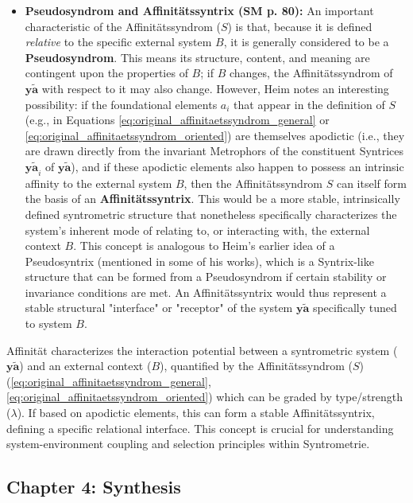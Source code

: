 \documentclass[12pt]{article}
\newcommand{\syntrix}{\bm{y\widetilde{a}}}
\newcommand{\affinitaetssyndrom}{S}
\begin{document}
\begin{itemize}
    \item \textbf{Pseudosyndrom and Affinitätssyntrix (SM p. 80):}
    An important characteristic of the Affinitätssyndrom (\( \affinitaetssyndrom \)) is that, because it is defined \textit{relative} to the specific external system \( B \), it is generally considered to be a \textbf{Pseudosyndrom}. This means its structure, content, and meaning are contingent upon the properties of \( B \); if \( B \) changes, the Affinitätssyndrom of \( \mathbf{y\widetilde{a}} \) with respect to it may also change. However, Heim notes an interesting possibility: if the foundational elements \( a_i \) that appear in the definition of \( \affinitaetssyndrom \) (e.g., in Equations \eqref{eq:original_affinitaetssyndrom_general} or \eqref{eq:original_affinitaetssyndrom_oriented}) are themselves apodictic (i.e., they are drawn directly from the invariant Metrophors of the constituent Syntrices \( \syntrix_i \) of \( \mathbf{y\widetilde{a}} \)), and if these apodictic elements also happen to possess an intrinsic affinity to the external system \( B \), then the Affinitätssyndrom \( \affinitaetssyndrom \) can itself form the basis of an \textbf{Affinitätssyntrix}. This would be a more stable, intrinsically defined syntrometric structure that nonetheless specifically characterizes the system's inherent mode of relating to, or interacting with, the external context \( B \). This concept is analogous to Heim's earlier idea of a Pseudosyntrix (mentioned in some of his works), which is a Syntrix-like structure that can be formed from a Pseudosyndrom if certain stability or invariance conditions are met. An Affinitätssyntrix would thus represent a stable structural "interface" or "receptor" of the system \( \mathbf{y\widetilde{a}} \) specifically tuned to system \( B \).
\end{itemize}

Affinität characterizes the interaction potential between a syntrometric system (\(\mathbf{y\widetilde{a}}\)) and an external context (\(B\)), quantified by the Affinitätssyndrom (\(\affinitaetssyndrom\)) (\eqref{eq:original_affinitaetssyndrom_general}, \eqref{eq:original_affinitaetssyndrom_oriented}) which can be graded by type/strength (\(\lambda\)). If based on apodictic elements, this can form a stable Affinitätssyntrix, defining a specific relational interface. This concept is crucial for understanding system-environment coupling and selection principles within Syntrometrie.

\subsection{Chapter 4: Synthesis}
\label{sec:chapter4_synthesis}
\end{document}
